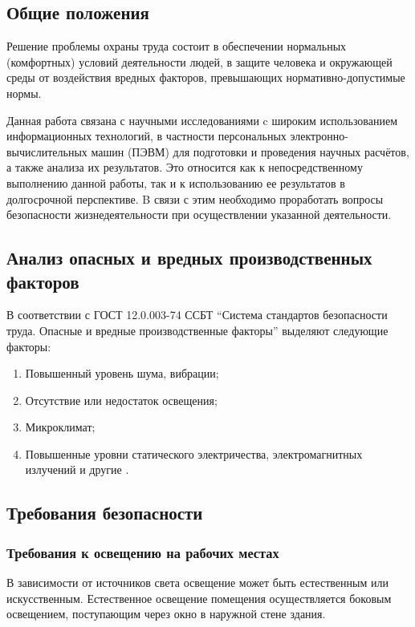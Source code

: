\subsection{Общие положения}
Решение проблемы охраны труда состоит в обеспечении нормальных (комфортных) условий деятельности людей, в защите человека и окружающей среды от воздействия вредных факторов, превышающих нормативно-допустимые нормы.

Данная работа связана с научными исследованиями c широким использованием информационных технологий, в частности персональных электронно-вычислительных машин (ПЭВМ) для подготовки и проведения научных расчётов, а также анализа их результатов. 
Это относится как к непосредственному выполнению данной работы, так и к использованию ее результатов в долгосрочной перспективе. B связи с этим необходимо проработать вопросы безопасности жизнедеятельности при осуществлении указанной деятельности.

\subsection{Анализ опасных и вредных производственных факторов}
В соответствии с ГОСТ 12.0.003-74 ССБТ ``Система стандартов безопасности труда. Опасные и вредные производственные факторы'' выделяют следующие факторы:

\begin{enumerate}
  \item Повышенный уровень шума, вибрации;
  \item Отсутствие или недостаток освещения;
  \item Микроклимат;
  \item Повышенные уровни статического электричества, электромагнитных излучений и другие \cite{bhzd_1}.
\end{enumerate}

\subsection{Требования безопасности}
\subsubsection{Требования к освещению на рабочих местах}

В зависимости от источников света освещение может быть естественным или искусственным. Естественное освещение помещения осуществляется боковым освещением, поступающим через окно в наружной стене здания.

